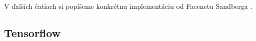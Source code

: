 \indent V ďalších čatiach si popíšeme konkrétnu implementáciu od Facenetu Sandberga \cite{davidsan26}.

\subsection{Tensorflow}


